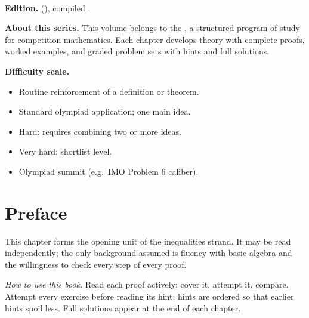 

\cleardoublepage
\thispagestyle{empty}
\noindent{\sffamily\bfseries\color{navy}\CurriculumTitle}\\[2pt]
{\small\color{slate}\CurriculumSubtitle\par}
\smallskip
\noindent{\color{rulegray}\rule{\textwidth}{0.4pt}}\par\smallskip
{\small
\noindent\textbf{Edition.} \CurriculumEdition{} (\CurriculumVersion),
compiled \CurriculumDate.\par
\smallskip
\noindent\textbf{About this series.} This volume belongs to the
\CurriculumSeries{}, a structured program of study for competition
mathematics. Each chapter develops theory with complete proofs, worked
examples, and graded problem sets with hints and full solutions.\par
\smallskip
\noindent\textbf{Difficulty scale.}%
\begin{itemize}[leftmargin=1.6em, itemsep=2pt, topsep=3pt]
  \item {}\; Routine reinforcement of a definition or theorem.
  \item {}\; Standard olympiad application; one main idea.
  \item {}\; Hard: requires combining two or more ideas.
  \item {}\; Very hard; shortlist level.
  \item {}\; Olympiad summit (e.g.\ IMO Problem 6 caliber).
\end{itemize}\par}

\frontmatter
\cleardoublepage
\tableofcontents

\cleardoublepage
\section*{Preface}
\noindent This chapter forms the opening unit of the inequalities
strand. It may be read independently; the only background assumed is
fluency with basic algebra and the willingness to check every step of
every proof.

\bigskip
\noindent\textit{How to use this book.} Read each proof actively: cover
it, attempt it, compare. Attempt every exercise before reading its
hint; hints are ordered so that earlier hints spoil less. Full
solutions appear at the end of each chapter.
